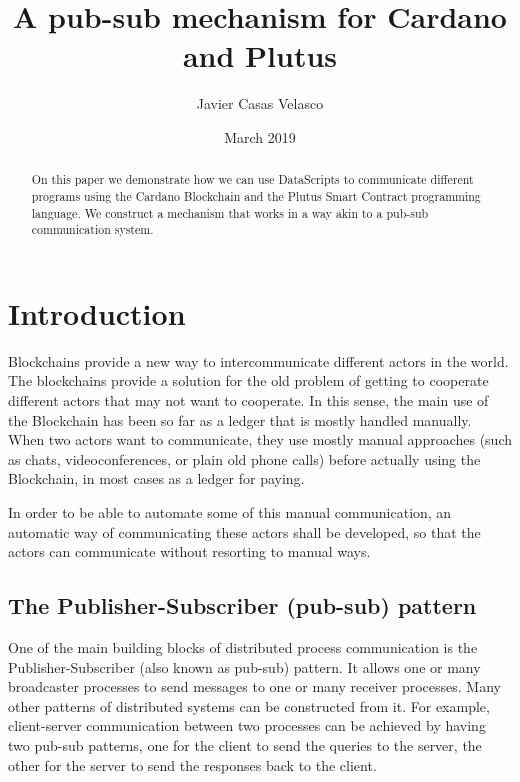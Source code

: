 \documentclass{article}
\begin{document}
\title{A pub-sub mechanism for Cardano and Plutus}
\author{Javier Casas Velasco}
\date{March 2019}
\maketitle

\begin{abstract}
  On this paper we demonstrate how we can use DataScripts to communicate different programs using the Cardano Blockchain and the Plutus Smart Contract programming language. We construct a mechanism that works in a way akin to a pub-sub communication system.
\end{abstract}

\tableofcontents

\pagebreak

\section{Introduction}
Blockchains provide a new way to intercommunicate different actors in the world. The blockchains provide a solution for the old problem of getting to cooperate different actors that may not want to cooperate. In this sense, the main use of the Blockchain has been so far as a ledger that is mostly handled manually. When two actors want to communicate, they use mostly manual approaches (such as chats, videoconferences, or plain old phone calls) before actually using the Blockchain, in most cases as a ledger for paying.

In order to be able to automate some of this manual communication, an automatic way of communicating these actors shall be developed, so that the actors can communicate without resorting to manual ways.

\subsection{The Publisher-Subscriber (pub-sub) pattern}

One of the main building blocks of distributed process communication is the Publisher-Subscriber (also known as pub-sub) pattern. It allows one or many broadcaster processes to send messages to one or many receiver processes. Many other patterns of distributed systems can be constructed from it.
For example, client-server communication between two processes can be achieved by having two pub-sub patterns, one for the client to send the queries to the server, the other for the server to send the responses back to the client.
\end{document}

